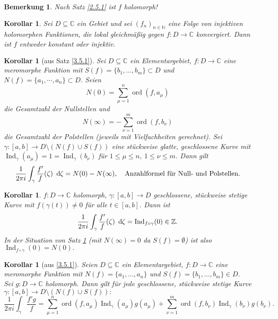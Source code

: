 \documentclass[a4paper,12pt]{book}
\theoremstyle{newthm}
\newtheorem{cor}[thm]{Korollar}
\theoremstyle{newdef}
\theoremstyle{newrem}
\newtheorem*{rem}{Bemerkung}
\newcommand{\N}{\mathbb{N}}
\newcommand{\Z}{\mathbb{Z}}
\newcommand{\C}{\mathbb{C}}
\renewcommand{\d}{\ \operatorname{d}\hspace{-2px}}
\newcommand{\ord}[2]{\operatorname{ord} \left( #1,#2 \right)}
\newcommand{\Ind}[1]{\operatorname{Ind}_{#1}}
\begin{document}
		\begin{rem}
			Nach Satz \ref{2.5.1} ist $f$ holomorph!
		\end{rem}
		
		\begin{cor}
			Sei $ D \subseteq \C $ ein Gebiet und sei $ (f_n)_{n \in \N} $ eine Folge von injektiven holomorphen Funktionen, die lokal gleichmäßig gegen $f: D \to \C$ konvergiert. Dann ist $f$ entweder konstant oder injektiv.
		\end{cor}
		
		\begin{cor}[aus Satz \ref{3.5.1}]\label{3.5.4}
			Sei $ D \subseteq \C $ ein Elementargebiet, $f: D \to \C$ eine meromorphe Funktion mit $ S(f) = \{b_1,\dotsc,b_m\} \subset D $ und $ N(f) = \{a_1,\dotsm,a_n\} \subset D $.	Seien 
			$$ N(0) = \sum_{\mu=1}^n \ord{f}{a_\mu} $$
			 die Gesamtzahl der Nullstellen und 
			 $$ N(\infty) = -\sum_{\nu=1}^m \ord{f}{b_\nu} $$
			 die Gesamtzahl der Polstellen (jeweils mit Vielfachheiten gerechnet). Sei $ \gamma: [a,b] \to D\setminus(N(f) \cup S(f)) $ eine stückweise glatte, geschlossene Kurve mit $ \Ind{\gamma}(a_\mu) = 1 = \Ind{\gamma}(b_\nu) $ für $ 1 \leq \mu \leq n,\ 1 \leq \nu \leq  m$. Dann gilt
			\[ \frac{1}{2\pi i} \int_\gamma \frac{f'}{f}(\zeta) \d\zeta = N(0) - N(\infty), \quad \text{Anzahlformel für Null- und Polstellen.} \]
		\end{cor}
		
		\begin{cor}
			$ f: D \to \C $ holomorph, $ \gamma: [a,b] \to D $ geschlossene, stückweise stetige Kurve mit $ f(\gamma(t)) \neq 0 $ für alle $ t \in [a,b] $. Dann ist 
			\[ \frac{1}{2\pi i} \int_\gamma \frac{f'}{f} (\zeta)\d\zeta = \Ind{f \circ \gamma}(0) \in \Z. \]
			In der Situation von Satz \ref{3.5.4} (mit $N(\infty) = 0$ da $S(f) = \emptyset$) ist also $ \Ind{f \circ \gamma}(0) = N(0). $ 
		\end{cor}
		
		\begin{cor}[aus \ref{3.5.1}]
			Seien $D \subseteq \C$ ein Elementargebiet, $ f: D \to \C $ eine meromorphe Funktion mit $ N(f) = \{a_1,\dotsc,a_n\} $ und $ S(f) = \{b_1,\dotsc,b_m\} \in D $.\\
			Sei $ g: D \to \C $ holomorph. Dann gilt für jede geschlossene, stückweise stetige Kurve $ \gamma: [a,b] \to D \setminus (N(f) \cup S(f)): $
			\[ \frac{1}{2\pi i} \int_\gamma \frac{f' g}{f} = \sum_{\mu=1}^n \ord{f}{a_\mu} \Ind{\gamma}(a_\mu)g(a_\mu) + \sum_{\nu=1}^m \ord{f}{b_\nu} \Ind{\gamma}(b_\nu)g(b_\nu). \]
		\end{cor}
		
		

	
	
	
	
		
	
	\listoftheorems[ignoreall,show={defn}]
	
	
	
\end{document}

